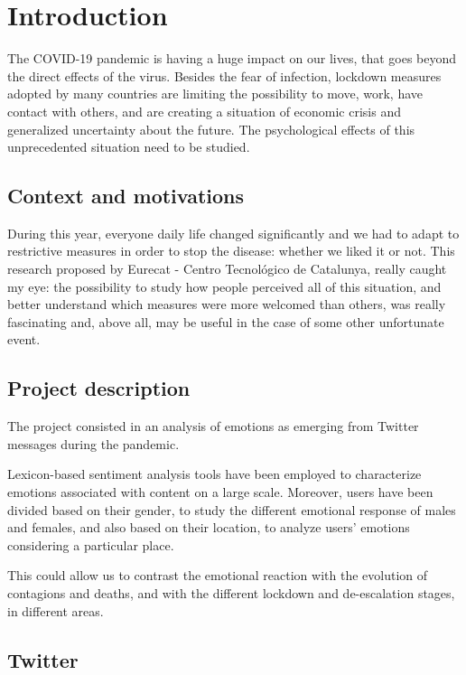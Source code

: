 \chapter{Introduction}
\label{cha:intro}

The COVID-19 pandemic is having a huge impact on our lives, that goes beyond the direct effects of the virus. Besides the fear of infection, lockdown measures adopted by many countries are limiting the possibility to move, work, have contact with others, and are creating a situation of economic crisis and generalized uncertainty about the future. The psychological effects of this unprecedented situation need to be studied.


\section{Context and motivations}
\label{sec:context}

During this year, everyone daily life changed significantly and we had to adapt to restrictive measures in order to stop the disease: whether we liked it or not. This research proposed by Eurecat - Centro Tecnológico de Catalunya, really caught my eye: the possibility to study how people perceived all of this situation, and better understand which measures were more welcomed than others, was really fascinating and, above all, may be useful in the case of some other unfortunate event.

\section{Project description}
\label{sec:project}

The project consisted in an analysis of emotions as emerging from Twitter messages during the pandemic.

Lexicon-based sentiment analysis tools have been employed to characterize emotions associated with content on a large scale. Moreover, users have been divided based on their gender, to study the different emotional response of males and females, and also based on their location, to analyze users' emotions considering a particular place. 

This could allow us to contrast the emotional reaction with the evolution of contagions and deaths, and with the different lockdown and de-escalation stages, in different areas.

\section{Twitter}
\label{sec:twitter}


